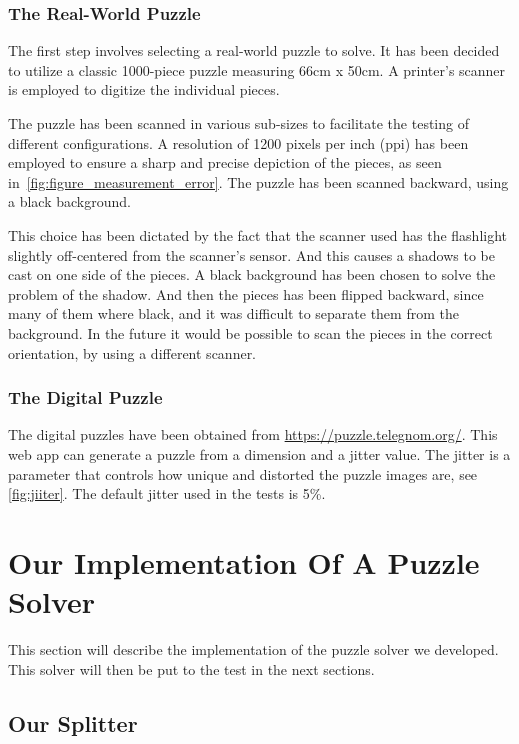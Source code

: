 \documentclass[epsfig,a4paper,11pt,titlepage,twoside,openany]{article}
\begin{document}
\subsubsection{The Real-World Puzzle}
The first step involves selecting a real-world
puzzle to solve. It has been decided to utilize a
classic 1000-piece puzzle measuring 66cm x 50cm.
A printer's scanner is employed to digitize the individual pieces.

The puzzle has been scanned in various sub-sizes to facilitate the testing of different configurations.
A resolution of 1200 pixels per inch (ppi) has been employed to ensure a sharp and precise
depiction of the pieces, as seen in~\cref{fig:figure_measurement_error}.
The puzzle has been scanned backward, using a black background.

This choice has been dictated by the fact that the scanner used has the flashlight
slightly off-centered from the scanner's sensor.
And this causes a shadows to be cast on one side of the pieces.
A black background has been chosen to solve the problem of the shadow.
And then the pieces has been flipped backward, since many of them where black,
and it was difficult to separate them from the background.
In the future it would be possible to scan the pieces in the correct orientation,
by using a different scanner.

\subsubsection{The Digital Puzzle}
The digital puzzles have been obtained from \url{https://puzzle.telegnom.org/}.
This web app can generate a puzzle from a dimension and a jitter value. The jitter is a parameter that controls
how unique and distorted the puzzle images are, see \cref{fig:jiiter}.
The default jitter used in the tests is 5\%.

\cleardoublepage
\section{Our Implementation Of A Puzzle Solver}

This section will describe the implementation of the puzzle solver we developed.
This solver will then be put to the test in the next sections.

\subsection{Our Splitter}
\end{document}
